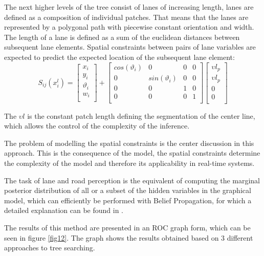 \documentclass[conference]{IEEEtran}
\begin{document}
The next higher levels of the tree consist of lanes of increasing length, lanes are defined as a composition of individual patches. That means that the lanes are represented by a polygonal path with piecewise constant orientation and width. The length of a lane is defined as a sum of the euclidean distances between subsequent lane elements. Spatial constraints between pairs of lane variables are expected to predict the expected location of the subsequent lane element:
\begin{equation}
S_{ij}(x_i^l) = \begin{bmatrix}
x_i \\
y_i \\
\vartheta_i \\
w_i \\
\end{bmatrix} +
\begin{bmatrix}
cos(\vartheta_i) & 0 & 0 & 0 \\
0 & sin(\vartheta_i) & 0 & 0 \\
0 & 0 & 1 & 0\\
0 & 0 & 0 & 1 \\
\end{bmatrix}
\begin{bmatrix}
\upsilon l_p \\
\upsilon l_p \\
0 \\
0 \\
\end{bmatrix}
\end{equation}

The $\upsilon l $ is the constant patch length defining the segmentation of the center line, which allows the control of the complexity of the inference. 

The problem of modelling the spatial constraints is the center discussion in this approach. This is the consequence of the model, the spatial constraints determine the complexity of the model and therefore its applicability in real-time systems. 

The task of lane and road perception is the equivalent of computing the marginal posterior distribution of all or a subset of the hidden variables in the graphical model, which can efficiently be performed with Belief Propagation, for which a detailed explanation can be found in \cite{lanesystem}.

The results of this method are presented in an ROC graph form, which can be seen in figure \ref{fig12}. The graph shows the results obtained based on 3 different approaches to tree searching.
\end{document}
